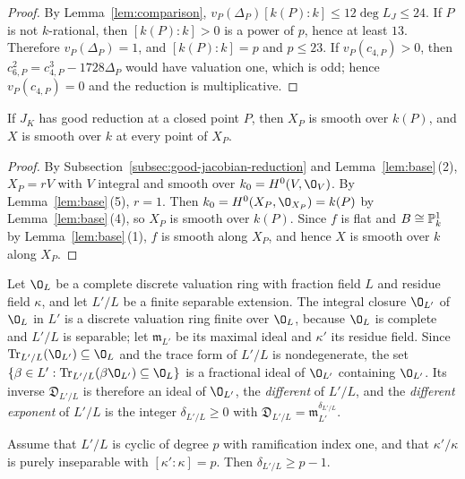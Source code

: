 \begin{proof}
By Lemma~\ref{lem:comparison}, $v_P(\Delta_P)[k(P):k]\leq 12\deg L_J\leq 24$.
If $P$ is not $k$-rational, then $[k(P):k]>0$ is a power of $p$, hence at least $13$.
Therefore $v_P(\Delta_P) = 1$, and $[k(P):k] = p$ and $p\leq 23$.
If $v_P(c_{4,P})>0$, then $c_{6,P}^2 = c_{4,P}^3-1728\Delta_P$ would have valuation one, which is odd; hence $v_P(c_{4,P}) = 0$ and the reduction is multiplicative.
\end{proof}

\begin{lemma}\label{lem:good}
If $J_K$ has good reduction at a closed point $P$, then $X_P$ is smooth over $k(P)$, and $X$ is smooth over $k$ at every point of $X_P$.
\end{lemma}

\begin{proof}
By Subsection~\ref{subsec:good-jacobian-reduction} and Lemma~\ref{lem:base}\,(2), $X_P = rV$ with $V$ integral and smooth over $k_0 = H^0(V,\O_V)$.
By Lemma~\ref{lem:base}\,(5), $r = 1$.
Then $k_0 = H^0(X_P,\O_{X_P}) = k(P)$ by Lemma~\ref{lem:base}\,(4), so $X_P$ is smooth over $k(P)$.
Since $f$ is flat and $B\cong\mathbb{P}^1_k$ by Lemma~\ref{lem:base}\,(1), $f$ is smooth along $X_P$, and hence $X$ is smooth over $k$ along $X_P$.
\end{proof}

Let $\O_L$ be a complete discrete valuation ring with fraction field $L$ and residue field $\kappa$, and let $L'/L$ be a finite separable extension.
The integral closure $\O_{L'}$ of $\O_L$ in $L'$ is a discrete valuation ring finite over $\O_L$, because $\O_L$ is complete and $L'/L$ is separable; let $\mathfrak m_{L'}$ be its maximal ideal and $\kappa'$ its residue field.
Since $\operatorname{Tr}_{L'/L}(\O_{L'})\subseteq\O_L$ and the trace form of $L'/L$ is nondegenerate, the set $\{\beta\in L' : \operatorname{Tr}_{L'/L}(\beta\O_{L'})\subseteq\O_L\}$ is a fractional ideal of $\O_{L'}$ containing $\O_{L'}$.
Its inverse $\mathfrak D_{L'/L}$ is therefore an ideal of $\O_{L'}$, the \emph{different} of $L'/L$, and the \emph{different exponent} of $L'/L$ is the integer $\delta_{L'/L}\geq 0$ with $\mathfrak D_{L'/L} = \mathfrak m_{L'}^{\delta_{L'/L}}$.

\begin{lemma}\label{lem:different}
  Assume that $L'/L$ is cyclic of degree $p$ with ramification index one, and that $\kappa'/\kappa$ is purely inseparable with $[\kappa':\kappa] = p$.
  Then $\delta_{L'/L}\geq p-1$.
\end{lemma}

